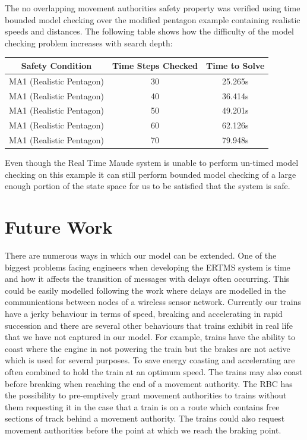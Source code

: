 The no overlapping movement authorities safety property was verified using time bounded model checking over the modified pentagon example containing realistic speeds and distances. The following table shows how the difficulty of the model checking problem increases with search depth:
\medskip
\begin{center}
\begin{tabular}{c | c | c} 
Safety Condition & Time Steps Checked & Time to Solve  \\ \hline
MA1 (Realistic Pentagon) & 30 & 25.265s \\
MA1 (Realistic Pentagon) & 40 & 36.414s \\
MA1 (Realistic Pentagon) & 50 & 49.201s \\
MA1 (Realistic Pentagon) & 60 & 62.126s \\
MA1 (Realistic Pentagon) & 70 & 79.948s \\
\end{tabular}
\end{center}
\medskip
Even though the Real Time Maude system is unable to perform un-timed model checking on this example it can still perform bounded model checking of a large enough portion of the state space for us to be satisfied that the system is safe.

\section{Future Work}
There are numerous ways in which our model can be extended. One of the biggest problems facing engineers when developing the ERTMS system is time and how it affects the transition of messages with delays often occurring. This could be easily modelled following the work \cite{PO07} where delays are modelled in the communications between nodes of a wireless sensor network. Currently our trains have a jerky behaviour in terms of speed, breaking and accelerating in rapid succession and there are several other behaviours that trains exhibit in real life that we have not captured in our model. For example, trains have the ability to coast where the engine in not powering the train but the brakes are not active which is used for several purposes. To save energy coasting and accelerating are often combined to hold the train at an optimum speed. The trains may also coast before breaking when reaching the end of a movement authority. The RBC has the possibility to pre-emptively grant movement authorities to trains without them requesting it in the case that a train is on a route which contains free sections of track behind a movement authority.  The trains could also request movement authorities before the point at which we reach the braking point.


